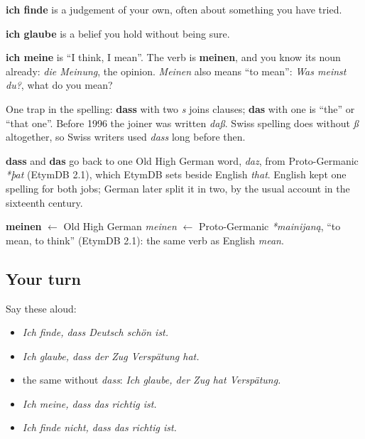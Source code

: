 \begin{culture}
\textbf{ich finde} is a judgement of your own, often about something you have tried.

\textbf{ich glaube} is a belief you hold without being sure.

\textbf{ich meine} is \textquotedblleft{}I think, I mean\textquotedblright{}. The verb is \textbf{meinen}, and you know its noun already: \emph{die Meinung}, the opinion. \emph{Meinen} also means \textquotedblleft{}to mean\textquotedblright{}: \emph{Was meinst du?}, what do you mean?

One trap in the spelling: \textbf{dass} with two \emph{s} joins clauses; \textbf{das} with one is \textquotedblleft{}the\textquotedblright{} or \textquotedblleft{}that one\textquotedblright{}. Before 1996 the joiner was written \emph{daß}. Swiss spelling does without \emph{ß} altogether, so Swiss writers used \emph{dass} long before then.
\end{culture}

\begin{cousinweb}
\textbf{dass} and \textbf{das} go back to one Old High German word, \emph{daz}, from Proto-Germanic \emph{*þat} (EtymDB 2.1), which EtymDB sets beside English \emph{that}. English kept one spelling for both jobs; German later split it in two, by the usual account in the sixteenth century.

\textbf{meinen} $\leftarrow$ Old High German \emph{meinen} $\leftarrow$ Proto-Germanic \emph{*mainijaną}, \textquotedblleft{}to mean, to think\textquotedblright{} (EtymDB 2.1): the same verb as English \emph{mean}.
\end{cousinweb}

\subsection*{Your turn}
Say these aloud:

\begin{itemize}
\raggedright
  \item \emph{Ich finde, dass Deutsch schön ist.}
  \item \emph{Ich glaube, dass der Zug Verspätung hat.}
  \item the same without \emph{dass}: \emph{Ich glaube, der Zug hat Verspätung.}
  \item \emph{Ich meine, dass das richtig ist.}
  \item \emph{Ich finde nicht, dass das richtig ist.}
\end{itemize}

